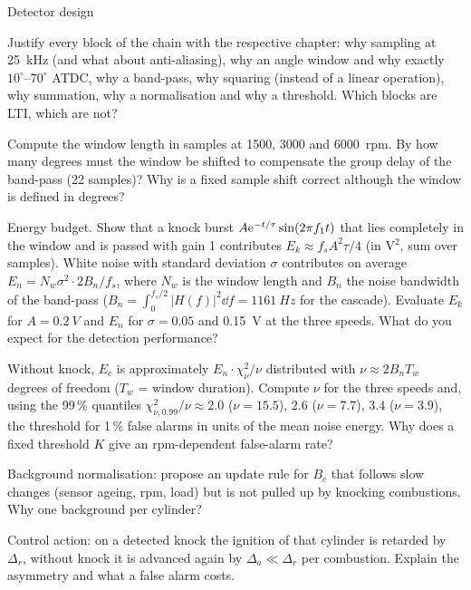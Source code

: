 \begin{exercise}{Detector design}{\Paper}
\begin{tasks}
  \item Justify every block of the chain with the respective chapter: why
    sampling at \SI{25}{kHz} (and what about anti-aliasing), why an angle
    window and why exactly $10^\circ$--$70^\circ$ ATDC, why a band-pass,
    why squaring (instead of a linear operation), why summation, why a
    normalisation and why a threshold. Which blocks are LTI, which are not?
  \item Compute the window length in samples at 1500, 3000 and \SI{6000}{rpm}.
    By how many degrees must the window be shifted to compensate the group delay
    of the band-pass (22 samples)? Why is a fixed sample shift correct although the
    window is defined in degrees?
  \item Energy budget. Show that a knock burst $A\mathrm{e}^{-t/\tau}\sin(2\pi f_1t)$ that lies
    completely in the window and is passed with gain 1 contributes
    $E_k\approx f_sA^2\tau/4$ (in V$^2$, sum over samples). White noise with standard
    deviation $\sigma$ contributes on average $E_n=N_w\sigma^2\cdot2B_n/f_s$, where
    $N_w$ is the window length and $B_n$ the noise bandwidth of the band-pass
    ($B_n=\int_0^{f_s/2}|H(f)|^2\dd f=\SI{1161}{Hz}$ for the cascade). Evaluate $E_k$ for
    $A=\SI{0.2}{V}$ and $E_n$ for $\sigma=0.05$ and \SI{0.15}{V} at the three speeds.
    What do you expect for the detection performance?
  \item Without knock, $E_c$ is approximately $E_n\cdot\chi^2_\nu/\nu$ distributed
    with $\nu\approx2B_nT_w$ degrees of freedom ($T_w$ = window duration). Compute
    $\nu$ for the three speeds and, using the 99\,\% quantiles
    $\chi^2_{\nu,0.99}/\nu\approx 2.0$ ($\nu=15.5$), $2.6$ ($\nu=7.7$),
    $3.4$ ($\nu=3.9$), the threshold for 1\,\% false alarms in units of the mean noise
    energy. Why does a fixed threshold $K$ give an rpm-dependent false-alarm rate?
  \item Background normalisation: propose an update rule for $B_c$ that follows slow
    changes (sensor ageing, rpm, load) but is not pulled up by knocking combustions.
    Why one background per cylinder?
  \item Control action: on a detected knock the ignition of that cylinder is retarded by
    $\Delta_r$, without knock it is advanced again by $\Delta_a\ll\Delta_r$ per
    combustion. Explain the asymmetry and what a false alarm costs.
\end{tasks}
\end{exercise}

